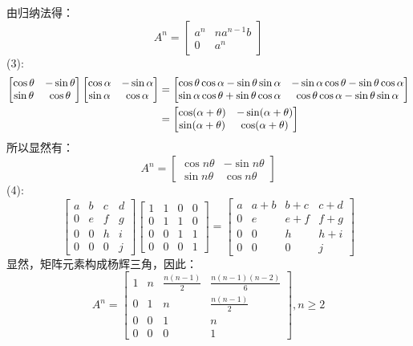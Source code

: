 \documentclass[utf8]{ctexart}
\begin{document}
由归纳法得：
\[A^n=
\begin{bmatrix}
	a^n&na^{n-1}b\\
	0&a^n
\end{bmatrix}\]
(3):\\
\begin{align}
	\begin{bmatrix}
		\cos\theta&-\sin\theta\\
		\sin\theta&\cos\theta
	\end{bmatrix}
	\begin{bmatrix}
		\cos\alpha&-\sin\alpha\\
		\sin\alpha&\cos\alpha
	\end{bmatrix}
	&=
	\begin{bmatrix}
		\cos\theta\cos\alpha-\sin\theta\sin\alpha&-\sin\alpha\cos\theta-\sin\theta\cos\alpha\\
		\sin\alpha\cos\theta+\sin\theta\cos\alpha&\cos\theta\cos\alpha-\sin\theta\sin\alpha
	\end{bmatrix}\notag\\
	&=
	\begin{bmatrix}
		\cos(\alpha+\theta)&-\sin(\alpha+\theta)\\
		\sin(\alpha+\theta)&\cos(\alpha+\theta)
	\end{bmatrix}\notag
\end{align}
所以显然有：
\[A^n=
\begin{bmatrix}
	\cos n\theta&-\sin n\theta\\
	\sin n\theta&\cos n\theta
\end{bmatrix}\]
(4):\\
\[
\begin{bmatrix}
	a&b&c&d\\
	0&e&f&g\\
	0&0&h&i\\
	0&0&0&j
\end{bmatrix}
\begin{bmatrix}
	1&1&0&0\\
	0&1&1&0\\
	0&0&1&1\\
	0&0&0&1
\end{bmatrix}
=
\begin{bmatrix}
	a&a+b&b+c&c+d\\
	0&e&e+f&f+g\\
	0&0&h&h+i\\
	0&0&0&j
\end{bmatrix}\]
显然，矩阵元素构成杨辉三角，因此：
\[A^n=
\begin{bmatrix}
	1&n&\frac{n(n-1)}{2}&\frac{n(n-1)(n-2)}{6}\\
	0&1&n&\frac{n(n-1)}{2}\\
	0&0&1&n\\
	0&0&0&1
\end{bmatrix},n\ge2\]
\end{document}
